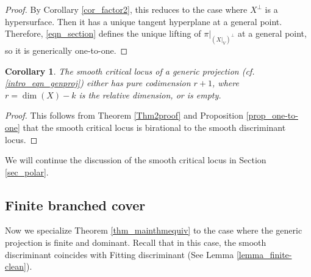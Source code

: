 \documentclass[12pt]{amsart}
\newtheorem{corollary}[theorem]{Corollary}
\begin{document}
\begin{proof}
 By Corollary \ref{cor_factor2}, this reduces to the case where $X^{\perp}$ is a hypersurface. Then it has a unique tangent hyperplane at a general point. Therefore, \eqref{eqn_section} defines the unique lifting of $\pi|_{(X|_V)^{\perp}}$ at a general point, so it is generically one-to-one.
\end{proof}


\begin{corollary}
    The smooth critical locus of a generic projection (cf. \eqref{intro_eqn_genproj}) either has pure codimension $r+1$, where $r=\dim(X)-k$ is the relative dimension, or is empty.
\end{corollary}
\begin{proof}
    This follows from Theorem \ref{Thm2proof} and Proposition \ref{prop_one-to-one} that the smooth critical locus is birational to the smooth discriminant locus.
\end{proof}
We will continue the discussion of the smooth critical locus in Section \ref{sec_polar}.



\subsection{Finite branched cover}
Now we specialize Theorem \ref{thm_mainthmequiv} to the case where the generic projection is finite and dominant. Recall that in this case, the smooth discriminant coincides with Fitting discriminant (See Lemma \ref{lemma_finite-clean}).
\end{document}

